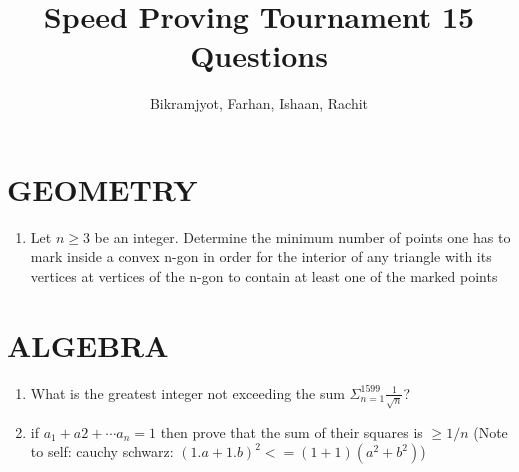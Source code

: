 \documentclass[12pt]{article}
\title{Speed Proving Tournament 15 Questions}
\author{Bikramjyot, Farhan, Ishaan, Rachit}
\begin{document}
\doublespacing
\maketitle

\section{GEOMETRY}

\begin{enumerate}
    \item Let $n \geq 3$ be an integer. Determine the minimum number of points one has to mark inside a convex n-gon in order for the interior of any triangle with its vertices at vertices of the n-gon to contain at least one of the marked points

    
\end{enumerate}



\section{ALGEBRA}

\begin{enumerate}

    \item What is the greatest integer not exceeding the sum $\Sigma_{n=1}^{1599}{\frac{1}{\sqrt{n}}}$?

    \item if $a_1 + a2 + \cdots a_n = 1$ then prove that the sum of their squares is $\geq 1/n$ (Note to self: cauchy schwarz: $(1.a + 1.b)^2 <= (1 + 1) (a^2 + b^2)$)
    
\end{enumerate}
\end{document}
